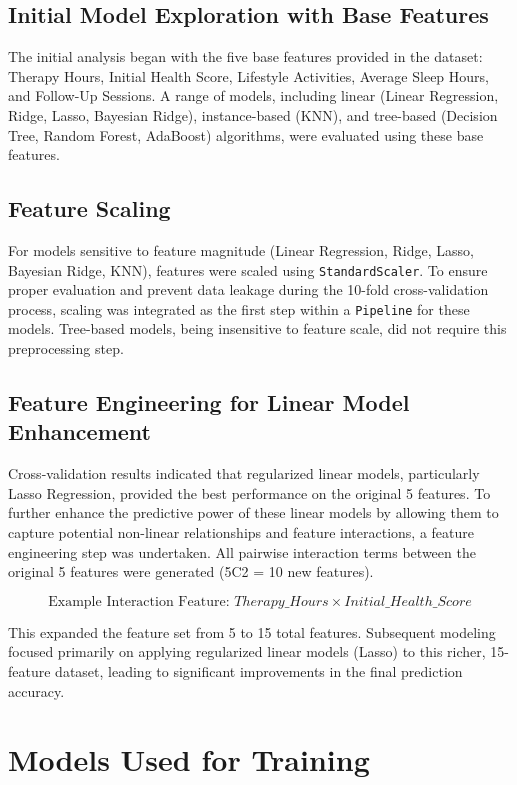 \documentclass[12pt,a4paper]{article}
\begin{document}
\subsection{Initial Model Exploration with Base Features}
The initial analysis began with the five base features provided in the dataset: Therapy Hours, Initial Health Score, Lifestyle Activities, Average Sleep Hours, and Follow-Up Sessions. A range of models, including linear (Linear Regression, Ridge, Lasso, Bayesian Ridge), instance-based (KNN), and tree-based (Decision Tree, Random Forest, AdaBoost) algorithms, were evaluated using these base features.

\subsection{Feature Scaling}
For models sensitive to feature magnitude (Linear Regression, Ridge, Lasso, Bayesian Ridge, KNN), features were scaled using \texttt{StandardScaler}. To ensure proper evaluation and prevent data leakage during the 10-fold cross-validation process, scaling was integrated as the first step within a \texttt{Pipeline} for these models. Tree-based models, being insensitive to feature scale, did not require this preprocessing step.

\subsection{Feature Engineering for Linear Model Enhancement}
Cross-validation results indicated that regularized linear models, particularly Lasso Regression, provided the best performance on the original 5 features. To further enhance the predictive power of these linear models by allowing them to capture potential non-linear relationships and feature interactions, a feature engineering step was undertaken. All pairwise interaction terms between the original 5 features were generated (5C2 = 10 new features).

\[
\text{Example Interaction Feature: } Therapy\_Hours \times Initial\_Health\_Score
\]

This expanded the feature set from 5 to 15 total features. Subsequent modeling focused primarily on applying regularized linear models (Lasso) to this richer, 15-feature dataset, leading to significant improvements in the final prediction accuracy.

\section{Models Used for Training}
\end{document}
